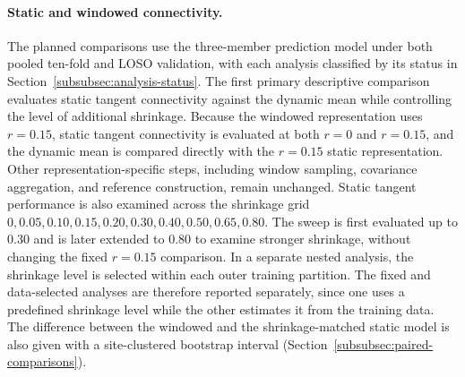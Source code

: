 \paragraph{\textbf{Static and windowed connectivity.}}
\label{par:static-windowed}
The planned comparisons use the three-member prediction model under both pooled ten-fold and LOSO validation, with each analysis classified by its status in Section~\ref{subsubsec:analysis-status}. The first primary descriptive comparison evaluates static tangent connectivity against the dynamic mean while controlling the level of additional shrinkage. Because the windowed representation uses $r=0.15$, static tangent connectivity is evaluated at both $r=0$ and $r=0.15$, and the dynamic mean is compared directly with the $r=0.15$ static representation. Other representation-specific steps, including window sampling, covariance aggregation, and reference construction, remain unchanged. Static tangent performance is also examined across the shrinkage grid ${0,0.05,0.10,0.15,0.20,0.30,0.40,0.50,0.65,0.80}$. The sweep is first evaluated up to 0.30 and is later extended to 0.80 to examine stronger shrinkage, without changing the fixed $r=0.15$ comparison. In a separate nested analysis, the shrinkage level is selected within each outer training partition. The fixed and data-selected analyses are therefore reported separately, since one uses a predefined shrinkage level while the other estimates it from the training data. The difference between the windowed and the shrinkage-matched static model is also given with a site-clustered bootstrap interval (Section~\ref{subsubsec:paired-comparisons}).

